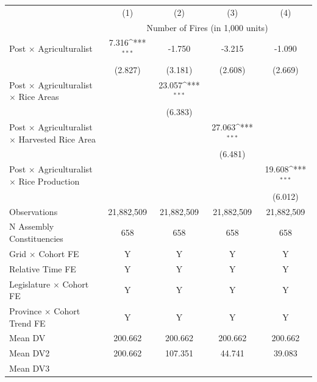 {
\def\sym#1{\ifmmode^{#1}\else\(^{#1}\)\fi}
\begin{tabular}{l*{4}{c}}
\hline
            &\multicolumn{1}{c}{(1)}         &\multicolumn{1}{c}{(2)}         &\multicolumn{1}{c}{(3)} &\multicolumn{1}{c}{(4)}         \\
            & \multicolumn{4}{c}{Number of Fires (in 1,000 units)} \\ \hline

Post $\times$ Agriculturalist&       7.316\sym{***}&      -1.750         &      -3.215         &      -1.090         \\
            &     (2.827)         &     (3.181)         &     (2.608)         &     (2.669)         \\
Post $\times$ Agriculturalist $\times$ Rice Areas&                     &      23.057\sym{***}&                     &                     \\
            &                     &     (6.383)         &                     &                     \\
Post $\times$ Agriculturalist $\times$ Harvested Rice Area&                     &                     &      27.063\sym{***}&                     \\
            &                     &                     &     (6.481)         &                     \\
Post $\times$ Agriculturalist $\times$ Rice Production&                     &                     &                     &      19.608\sym{***}\\
            &                     &                     &                     &     (6.012)         \\
\hline
Observations&  21,882,509         &  21,882,509         &  21,882,509         &  21,882,509         \\
N Assembly Constituencies&         658         &         658         &         658         &         658         \\
Grid  $\times$ Cohort FE&           Y         &           Y         &           Y         &           Y         \\
Relative Time FE&           Y         &           Y         &           Y         &           Y         \\
Legislature  $\times$ Cohort FE&           Y         &           Y         &           Y         &           Y         \\
Province  $\times$ Cohort Trend FE&           Y         &           Y         &           Y         &           Y         \\
Mean DV     &     200.662         &     200.662         &     200.662         &     200.662         \\
Mean DV2    &     200.662         &     107.351         &      44.741         &      39.083         \\
Mean DV3    &                     &                     &                     &                     \\
\hline
\end{tabular}
}
